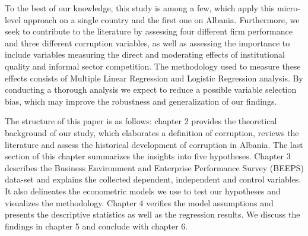 To the best of our knowledge, this study is among a few, which apply this micro-level approach on a single country and the first one on Albania. Furthermore, we seek to contribute to the literature by assessing four different firm performance and three different corruption variables, as well as assessing the importance to include variables measuring the direct and moderating effects of institutional quality and informal sector competition. The methodology used to measure these effects consists of Multiple Linear Regression and Logistic Regression analysis. By conducting a thorough analysis we expect to reduce a possible variable selection bias, which may improve the robustness and generalization of our findings. 

The structure of this paper is as follows: chapter 2 provides the theoretical background of our study, which elaborates a definition of corruption, reviews the literature and assess the historical development of corruption in Albania. The last section of this chapter summarizes the insights into five hypotheses. Chapter 3 describes the Business Environment and Enterprise Performance Survey (BEEPS) data-set and explains the collected dependent, independent and control variables. It also delineates the econometric models we use to test our hypotheses and visualizes the methodology. Chapter 4 verifies the model assumptions and presents the descriptive statistics as well as 
the regression results. We discuss the findings in chapter 5 and conclude with chapter 6.

